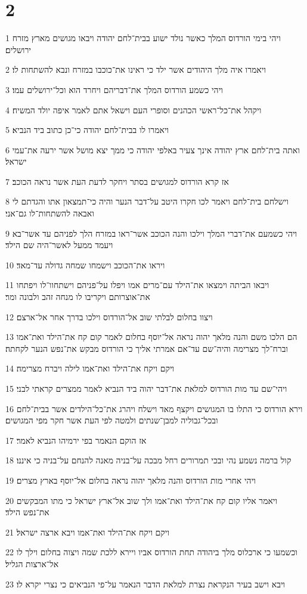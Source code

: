 \chapter{2}

\par 1 ויהי בימי הורדוס המלך כאשר נולד ישוע בבית־לחם יהודה ויבאו מגושים מארץ מזרח ירושלים׃
\par 2 ויאמרו איה מלך היהודים אשר ילד כי ראינו את־כוכבו במזרח ונבא להשתחות לו׃
\par 3 ויהי כשמע הורדוס המלך את־דבריהם ויחרד הוא וכל־ירושלים עמו׃
\par 4 ויקהל את־כל־ראשי הכהנים וסופרי העם וישאל אתם לאמר איפה יולד המשיח׃
\par 5 ויאמרו לו בבית־לחם יהודה כי־כן כתוב ביד הנביא׃
\par 6 ואתה בית־לחם ארץ יהודה אינך צעיר באלפי יהודה כי ממך יצא מושל אשר ירעה את־עמי ישראל׃
\par 7 אז קרא הורדוס למגושים בסתר ויחקר לדעת העת אשר נראה הכוכב׃
\par 8 וישלחם בית־לחם ויאמר לכו חקרו היטב על־דבר הנער והיה כי־תמצאון אתו והגדתם לי ואבאה להשתחות־לו גם־אני׃
\par 9 ויהי כשמעם את־דברי המלך וילכו והנה הכוכב אשר־ראו במזרח הלך לפניהם עד אשר־בא ויעמד ממעל לאשר־היה שם הילד׃
\par 10 ויראו את־הכוכב וישמחו שמחה גדולה עד־מאד׃
\par 11 ויבאו הביתה וימצאו את־הילד עם־מרים אמו ויפלו על־פניהם וישתחוו־לו ויפתחו את־אוצרותם ויקריבו לו מנחה זהב ולבונה ומר׃
\par 12 ויצוו בחלום לבלתי שוב אל־הורדוס וילכו בדרך אחר אל־ארצם׃
\par 13 הם הלכו משם והנה מלאך יהוה נראה אל־יוסף בחלום לאמר קום קח את־הילד ואת־אמו וברח־לך מצרימה והיה־שם עד־אם אמרתי אליך כי הורדוס מבקש את־נפש הנער לקחתה׃
\par 14 ויקם ויקח את־הילד ואת־אמו לילה ויברח מצרימה׃
\par 15 ויהי־שם עד מות הורדוס למלאת את־דבר יהוה ביד הנביא לאמר ממצרים קראתי לבני׃
\par 16 וירא הורדוס כי התלו בו המגושים ויקצף מאד וישלח ויהרג את־כל־הילדים אשר בבית־לחם ובכל־גבוליה למבן־שנתים ולמטה לפי העת אשר חקר מפי המגושים׃
\par 17 אז הוקם הנאמר בפי ירמיהו הנביא לאמר׃
\par 18 קול ברמה נשמע נהי ובכי תמרורים רחל מבכה על־בניה מאנה להנחם על־בניה כי איננו׃
\par 19 ויהי אחרי מות הורדוס והנה מלאך יהוה נראה בחלום אל־יוסף בארץ מצרים׃
\par 20 ויאמר אליו קום קח את־הילד ואת־אמו ולך שוב אל־ארץ ישראל כי מתו המבקשים את־נפש הילד׃
\par 21 ויקם ויקח את־הילד ואת־אמו ויבא ארצה ישראל׃
\par 22 וכשמעו כי ארכלוס מלך ביהודה תחת הורדוס אביו ויירא ללכת שמה ויצוה בחלום וילך לו אל־ארצות הגליל׃
\par 23 ויבא וישב בעיר הנקראת נצרת למלאת הדבר הנאמר על־פי הנביאים כי נצרי יקרא לו׃

